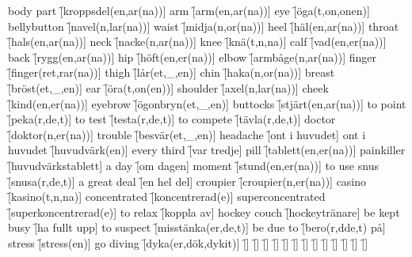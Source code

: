 \begin{questions}
    \begin{multicols}{2}
        \raggedcolumns
        \question body part \f[kroppsdel(en,ar(na))]
        \question arm \f[arm(en,ar(na))]
        \question eye \f[öga(t,on,onen)]
        \question bellybutton \f[navel(n,lar(na))]
        \question waist \f[midja(n,or(na))]
        \question heel \f[häl(en,ar(na))]
        \question throat \f[hals(en,ar(na))]
        \question neck \f[nacke(n,ar(na))]
        \question knee \f[knä(t,n,na)]
        \question calf \f[vad(en,er(na))]
        \question back \f[rygg(en,ar(na))]
        \question hip \f[höft(en,er(na))]
        \question elbow \f[armbåge(n,ar(na))]
        \question finger \f[finger(ret,rar(na))]
        \question thigh \f[lår(et,\_,en)]
        \question chin \f[haka(n,or(na))]
        \question breast \f[bröst(et,\_,en)]
        \question ear \f[öra(t,on(en))]
        \question shoulder \f[axel(n,lar(na))]
        \question cheek \f[kind(en,er(na))]
        \question eyebrow \f[ögonbryn(et,\_,en)]
        \question buttocks \f[stjärt(en,ar(na))]
        \question to point \f[peka(r,de,t)]
        \question to test \f[testa(r,de,t)]
        \question to compete \f[tävla(r,de,t)]
        \question doctor \f[doktor(n,er(na))]
        \question trouble \f[besvär(et,\_,en)]
        \question headache \f[ont i huvudet]
        \question ont i huvudet \f[huvudvärk(en)]
        \question every third \f[var tredje]
        \question pill \f[tablett(en,er(na))]
        \question painkiller \f[huvudvärkstablett]
        \question a day \f[om dagen]
        \question moment \f[stund(en,er(na))]
        \question to use snus \f[snusa(r,de,t)]
        \question a great deal \f[en hel del]
        \question croupier \f[croupier(n,er(na))]
        \question casino \f[kasino(t,n,na)]
        \question concentrated \f[koncentrerad(e)]
        \question superconcentrated \f[superkoncentrerad(e)]
        \question to relax \f[koppla av]
        \question hockey couch \f[hockeytränare]
        \question be kept busy \f[ha fullt upp]
        \question to suspect \f[misstänka(er,de,t)]
        \question be due to \f[bero(r,dde,t) på]
        \question stress \f[stress(en)]
        \question go diving \f[dyka(er,dök,dykit)]
        \question \f[]
        \question \f[]
        \question \f[]
        \question \f[]
        \question \f[]
        \question \f[]
        \question \f[]
        \question \f[]
        \question \f[]
        \question \f[]
        \question \f[]
        \question \f[]
        \question \f[]

\end{multicols}
\end{questions}
